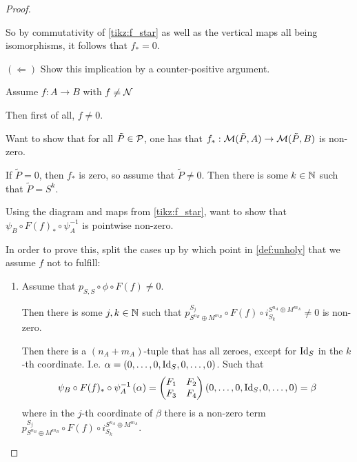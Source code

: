 \begin{proof}
\begin{enumerate}
{            So by commutativity of \autoref{tikz:f_star} as well as the vertical maps all being isomorphisms, it follows that \( f_* = 0 \).

            \( ( \Leftarrow ) \) Show this implication by a counter-positive argument.

            Assume \( f: A \to B \) with \( f \neq {\mathcal{N}} \)

            Then first of all, \( f \neq 0 \).

            Want to show that for all \( \tilde{P} \in {\mathcal{P}} \), one has that \( f_*: {\mathcal{M}}(\tilde{P}, A) \to {\mathcal{M}}(\tilde{P}, B)\) is non-zero.

            If \( \tilde{P} = 0 \), then \( f_* \) is zero, so assume that \( \tilde{P} \neq 0 \). Then there is some \( k \in {\mathbb{N}} \) such that \( \tilde{P} = S^k \).

            Using the diagram and maps from \autoref{tikz:f_star}, want to show that \( \psi_B \circ F(f)_* \circ \psi_A^{-1} \) is pointwise non-zero.

            In order to prove this, split the cases up by which point in \autoref{def:unholy} that we assume \( f \) not to fulfill:
            \begin{enumerate}
                \item {
                    Assume that \( p_{S, S} \circ \phi \circ F(f) \neq 0 \).

                    Then there is some \( j, k \in {\mathbb{N}} \) such that \( p_{S^{n_B} \oplus M^{m_B}}^{S_j} \circ F(f) \circ i_{S_k}^{S^{n_A} \oplus M^{m_A}} \neq 0 \) is non-zero.

                    Then there is a \( (n_A + m_A) \)-tuple that has all zeroes, except for \( \operatorname{Id}_S \) in the \( k \)-th coordinate. I.e. \( \alpha = \left( 0, \dots, 0, \operatorname{Id}_S, 0, \dots, 0 \right) \). Such that
                    \[
                        \psi_B \circ F(f)_* \circ \psi_A^{-1} \left( \alpha \right)
                        =
                        \begin{pmatrix}
                            F_1 & F_2 \\
                            F_3 & F_4
                        \end{pmatrix}
                        \left( 0, \dots, 0, \operatorname{Id}_S, 0, \dots, 0 \right)
                        = \beta
                    \]
                    where in the \( j \)-th coordinate of \( \beta \) there is a non-zero term \( p_{S^{n_B} \oplus M^{m_B}}^{S_j} \circ F(f) \circ i_{S_k}^{S^{n_A} \oplus M^{m_A}} \).

}
\end{enumerate}}
\end{enumerate}
\end{proof}
